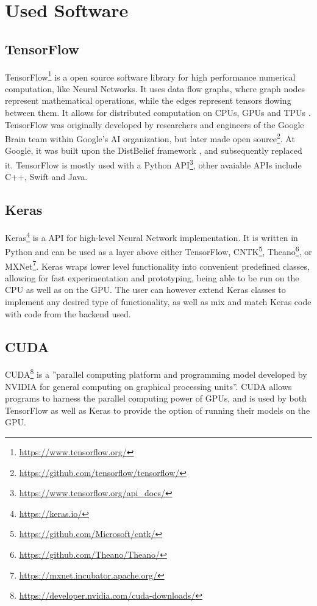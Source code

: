 \documentclass[11pt,a4paper,twoside,openright]{scrbook}
\begin{document}
\section{Used Software}

\subsection{TensorFlow}
TensorFlow\footnote{\url{https://www.tensorflow.org/}} is a open source software library for high performance numerical computation, like Neural Networks. It uses data flow graphs, where graph nodes represent mathematical operations, while the edges represent tensors flowing between them. It allows for distributed computation on CPUs, GPUs and TPUs \cite{Abadi16}.
TensorFlow was originally developed by researchers and engineers of the Google Brain team within Google's AI organization, but later made open source\footnote{\url{https://github.com/tensorflow/tensorflow/}}. At Google, it was built upon the DistBelief framework \cite{Dean12}, and subsequently replaced it\cite[p.\,266]{Abadi16}.
TensorFlow is mostly used with a Python API\footnote{\url{https://www.tensorflow.org/api_docs/}}, other avaiable APIs include C++, Swift and Java.

\subsection{Keras}
Keras\footnote{\url{https://keras.io/}} is a API for high-level Neural Network implementation. It is written in Python and can be used as a layer above either TensorFlow, CNTK\footnote{\url{https://github.com/Microsoft/cntk/}}, Theano\footnote{\url{https://github.com/Theano/Theano/}}, or MXNet\footnote{\url{https://mxnet.incubator.apache.org/}}.
Keras wraps lower level functionality into convenient predefined classes, allowing for fast experimentation and prototyping, being able to be run on the CPU as well as on the GPU. The user can however extend Keras classes to implement any desired type of functionality, as well as mix and match Keras code with code from the backend used.

\subsection{CUDA}
CUDA\footnote{\url{https://developer.nvidia.com/cuda-downloads/}} is a ''parallel computing platform and programming model developed by NVIDIA for general computing on graphical processing units''\cite{url:cuda}.
CUDA allows programs to harness the parallel computing power of GPUs, and is used by both TensorFlow as well as Keras to provide the option of running their models on the GPU.
\end{document}
